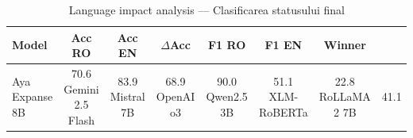\begin{table}[H]
\centering
\footnotesize
\caption{Language impact analysis — Clasificarea statusului final}
\label{tab:lang-impact-final-status-classification}
\begin{tabular}{lcccccc}
\toprule
\textbf{Model} & \textbf{Acc RO} & \textbf{Acc EN} & \textbf{$\Delta$Acc} & \textbf{F1 RO} & \textbf{F1 EN} & \textbf{Winner} \\
\midrule
Aya Expanse 8B & 70.6%
Gemini 2.5 Flash & 83.9%
Mistral 7B & 68.9%
OpenAI o3 & 90.0%
Qwen2.5 3B & 51.1%
XLM-RoBERTa & 22.8%
RoLLaMA 2 7B & 41.1%
\bottomrule
\end{tabular}
\end{table}